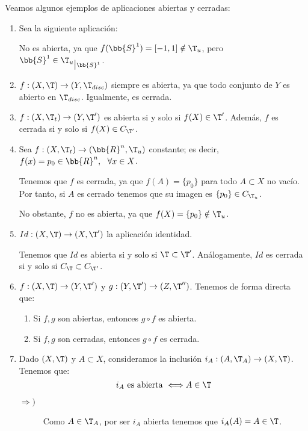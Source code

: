 \begin{ejemplo} Veamos algunos ejemplos de aplicaciones abiertas y cerradas:
\begin{enumerate}
    \item Sea la siguiente aplicación:

    No es abierta, ya que $f(\bb{S}^1)=[-1,1]\notin \T_u$, pero $\bb{S}^1\in {\T_u}_{\big| \bb{S}^1}$.


    \item $f:(X,\T)\to (Y,\T_{disc})$ siempre es abierta, ya que todo conjunto de $Y$ es abierto en $\T_{disc}$. Igualmente, es cerrada.

    \item $f:(X,\T_t)\to (Y,\T')$ es abierta si y solo si $f(X)\in \T'$. Además, $f$ es cerrada si y solo si $f(X)\in C_{\T'}$.

    \item Sea $f:(X,\T_t)\to (\bb{R}^n,\T_u)$ constante; es decir, $f(x)=p_0\in \bb{R}^n,~~\forall x\in X$.

    Tenemos que $f$ es cerrada, ya que $f(A)=\{p_0\}$ para todo $A\subset X$ no vacío. Por tanto, si $A$ es cerrado tenemos que su imagen es $\{p_0\}\in C_{\T_u}$.

    No obstante, $f$ no es abierta, ya que $f(X)=\{p_0\}\notin \T_u$.

    \item $Id:(X,\T)\to (X,\T')$ la aplicación identidad. 
    
    Tenemos que $Id$ es abierta si y solo si $\T\subset \T'$. Análogamente, $Id$ es cerrada si y solo si $C_\T\subset C_{\T'}$.

    \item $f:(X,\T)\to (Y,\T')$ y $g:(Y,\T')\to (Z,\T'')$. Tenemos de forma directa que:
    \begin{enumerate}
        \item Si $f,g$ son abiertas, entonces $g\circ f$ es abierta.
        \item Si $f,g$ son cerradas, entonces $g\circ f$ es cerrada.
    \end{enumerate}


    \item Dado $(X,\T)$ y $A\subset X$, consideramos la inclusión $i_A:(A,\T_A)\to (X,\T)$. Tenemos que:
    \begin{equation*}
        i_A \text{ es abierta }\Longleftrightarrow A\in \T
    \end{equation*}
    \begin{description}
        \item[$\Longrightarrow)$] Como $A\in \T_A$, por ser $i_A$ abierta tenemos que $i_A(A)=A\in \T$.


\end{description}
\end{enumerate}
\end{ejemplo}
